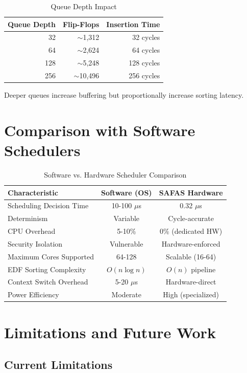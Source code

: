 \documentclass[12pt,a4paper]{article}
\begin{document}
\begin{table}[H]
\centering
\begin{tabular}{|r|r|r|}
\hline
\textbf{Queue Depth} & \textbf{Flip-Flops} & \textbf{Insertion Time} \\
\hline
32 & $\sim$1,312 & 32 cycles \\
64 & $\sim$2,624 & 64 cycles \\
128 & $\sim$5,248 & 128 cycles \\
256 & $\sim$10,496 & 256 cycles \\
\hline
\end{tabular}
\caption{Queue Depth Impact}
\end{table}

Deeper queues increase buffering but proportionally increase sorting latency.

\section{Comparison with Software Schedulers}

\begin{table}[H]
\centering
\begin{tabular}{|l|c|c|}
\hline
\textbf{Characteristic} & \textbf{Software (OS)} & \textbf{SAFAS Hardware} \\
\hline
Scheduling Decision Time & 10-100 $\mu$s & 0.32 $\mu$s \\
Determinism & Variable & Cycle-accurate \\
CPU Overhead & 5-10\% & 0\% (dedicated HW) \\
Security Isolation & Vulnerable & Hardware-enforced \\
Maximum Cores Supported & 64-128 & Scalable (16-64) \\
EDF Sorting Complexity & $O(n \log n)$ & $O(n)$ pipeline \\
Context Switch Overhead & 5-20 $\mu$s & Hardware-direct \\
Power Efficiency & Moderate & High (specialized) \\
\hline
\end{tabular}
\caption{Software vs. Hardware Scheduler Comparison}
\end{table}

\section{Limitations and Future Work}

\subsection{Current Limitations}
\end{document}
